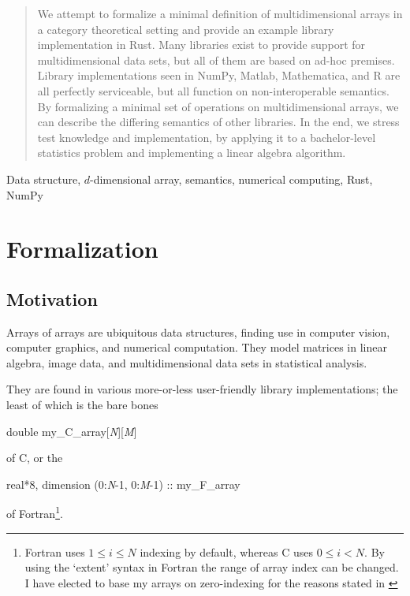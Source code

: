\documentclass{DIKU-report-variant}
\begin{document}
\maketitle

\begin{abstract}
  We attempt to formalize a minimal definition of multidimensional arrays
  in a category theoretical setting and provide an example library implementation in Rust.
  Many libraries exist to provide support for multidimensional data sets, but all
  of them are based on ad-hoc premises.
  Library implementations seen in NumPy, Matlab, Mathematica, and R are all
  perfectly serviceable, but all function on non-interoperable semantics.
  By formalizing a minimal set of operations on multidimensional arrays, we can
  describe the differing semantics of other libraries.
  In the end, we stress test knowledge and implementation, by applying it to
  a bachelor-level statistics problem and implementing a linear algebra algorithm.
\end{abstract}

\begin{keywords}
  Data structure, \(d\)-dimensional array, semantics, numerical computing, Rust, NumPy
\end{keywords}

\setcounter{tocdepth}{2}
\tableofcontents

\chapter{Formalization}

\section{Motivation}

Arrays of arrays are ubiquitous data structures, finding use
in computer vision, computer graphics, and numerical computation.
They model matrices in linear algebra, image data, and multidimensional data sets in statistical analysis.

They are found in various more-or-less user-friendly library implementations;
the least of which is the bare bones
\begin{center}
\ttfamily double my\_C\_array[\textit{N}][\textit{M}]
\end{center}
of C, or the
\begin{center}
\ttfamily real*8, dimension (0:\textit{N}-1, 0:\textit{M}-1) :: my\_F\_array
\end{center}
of Fortran\footnote{Fortran uses \(1\le i\le N\) indexing by default, whereas C uses \(0\le i<N\).
By using the `extent' syntax in Fortran the range of array index can be changed. I have elected
to base my arrays on zero-indexing for the reasons stated in \cite{EWD831}}.
\end{document}
